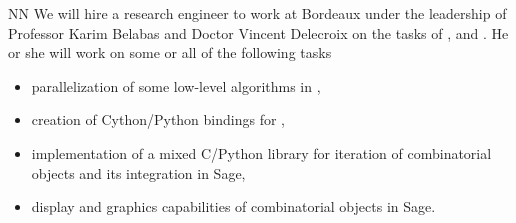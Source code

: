 \begin{participant}[type=R, PM=48]{NN}
We will hire a research engineer to work at Bordeaux
 under the leadership of Professor Karim Belabas and Doctor Vincent
Delecroix on the tasks of ,  and .
He or she will work on some or all of the following tasks
\begin{itemize}
\item parallelization of some low-level algorithms in \PariGP,
\item creation of Cython/Python bindings for \PariGP,
\item implementation of a mixed C/Python library for iteration of combinatorial
objects and its integration in Sage,
\item display and graphics capabilities of combinatorial objects in Sage.
\end{itemize}
\end{participant}
